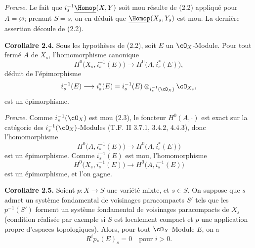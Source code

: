 \emph{Preuve.} Le fait que $i_s^{-1}\underline{\Homop}(X,Y)$ soit mou résulte de (2.2) appliqué pour $A=\varnothing$; prenant $S=s$, on en déduit que $\underline{\Homop}(X_s,Y_s)$ est mou. La dernière assertion découle de (2.2).

\textbf{Corollaire 2.4.} Sous les hypothèses de (2.2), soit $E$ un $\cO_X$-Module. Pour tout fermé $A$ de $X_s$, l'homomorphisme canonique
\[
  H^0\bigl(X_s,i_s^{-1}(E)\bigr)
  \longrightarrow
  H^0\bigl(A,i_s^*(E)\bigr),
\]
déduit de l'épimorphisme
\[
  i_s^{-1}(E)\longrightarrow i_s^*(E)
  =i_s^{-1}(E)\otimes_{i_s^{-1}(\cO_X)}\cO_{X_s},
\]
est un épimorphisme.

\emph{Preuve.} Comme $i_s^{-1}(\cO_X)$ est mou (2.3), le foncteur $H^0(A,\cdot)$ est exact sur la catégorie des $i_s^{-1}(\cO_X)$-Modules (T.F. II 3.7.1, 3.4.2, 4.4.3), donc l'homomorphisme
\[
  H^0\bigl(A,i_s^{-1}(E)\bigr)
  \longrightarrow
  H^0\bigl(A,i_s^*(E)\bigr)
\]
est un épimorphisme. Comme $i_s^{-1}(E)$ est mou, l'homomorphisme
\[
  H^0\bigl(X_s,i_s^{-1}(E)\bigr)
  \longrightarrow
  H^0\bigl(A,i_s^{-1}(E)\bigr)
\]
est un épimorphisme, et l'on gagne.

\textbf{Corollaire 2.5.} Soient $p:X\to S$ une variété mixte, et $s\in S$. On suppose que $s$ admet un système fondamental de voisinages paracompacts $S'$ tels que les $p^{-1}(S')$ forment un système fondamental de voisinages paracompacts de $X_s$ (condition réalisée par exemple si $S$ est localement compact et $p$ une application propre d'espaces topologiques). Alors, pour tout $\cO_X$-Module $E$, on a
\[
  R^i p_*(E)_s=0 \quad \text{pour } i>0.
\]

